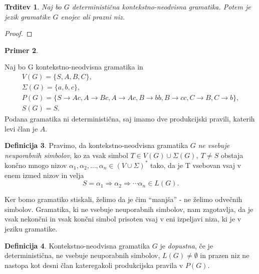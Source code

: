 \documentclass{amsart}
\theoremstyle{definition}
\newtheorem{definicija}{Definicija}[section]
\newtheorem{primer}[definicija]{Primer}
\theoremstyle{plain} %
\newtheorem{trditev}[definicija]{Trditev}
\begin{document}
\begin{trditev}

    Naj bo $ G $ deterministična kontekstno-neodvisna gramatika. Potem je jezik gramatike $ G $ enojec ali prazni niz.

\end{trditev}

\begin{proof}

\end{proof}

\begin{primer}\label{nedeterministicna}

    Naj bo G kontekstno-neodvisna gramatika in 
    \begin{gather*}
        V(G) = \{ S, A, B, C \}, \\
        \Sigma(G) = \{ a, b, c \}, \\
        P(G) = \{ S \rightarrow \mathit{Ac}, A \rightarrow \mathit{Bc}, A \rightarrow \mathit{Ac},
        B \rightarrow \mathit{bb}, B \rightarrow \mathit{cc}, C \rightarrow \mathit{B}, C \rightarrow \mathit{b} \}, \\
        S(G) = S.
    \end{gather*}
    Podana gramatika ni deterministična, saj imamo dve produkcijski pravili, katerih levi član je $ A $. 
    
\end{primer}

\begin{definicija}
    
    Pravimo, da kontekstno-neodvisna gramatika $ G $ \textit{ne vsebuje neuporabnih simbolov}, ko za vsak simbol
    $ T \in V(G) \cup \Sigma(G), \ T \neq S $ obstaja končno mnogo nizov $ \alpha_1, \alpha_2, \ldots, \alpha_n \in 
    (V \cup \Sigma)^* $ tako, da je T vsebovan vsaj v enem izmed nizov in velja
    \[
        S = \alpha_1 \Rightarrow \alpha_2 \Rightarrow \cdots \alpha_n \in L(G).
    \]

\end{definicija}

Ker bomo gramatiko stiskali, želimo da je čim ``manjša'' - ne želimo odvečnih simbolov. Gramatika, ki ne vsebuje neuporabnih
simbolov, nam zagotavlja, da je vsak nekončni in vsak končni simbol prisoten vsaj v eni izpeljavi niza, ki je v jeziku gramatike.

\begin{definicija}
    
    Kontekstno-neodvisna gramatika $ G $ je \textit{dopustna}, če je deterministična, ne vsebuje neuporabnih simbolov,
    $ L(G) \neq \emptyset $ in prazen niz ne nastopa kot desni član kateregakoli produkcijska pravila v $ P(G) $.

\end{definicija}
\end{document}
